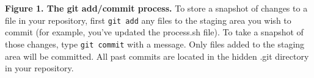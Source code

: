\textbf{Figure 1. The git add/commit process.} To store a snapshot of changes to a file in your repository, first \verb|git add| any files to the staging area you wish to commit (for example, you've updated the process.sh file). To take a snapshot of those changes, type \verb|git commit| with a message. Only files added to the staging area will be committed. All past commits are located in the hidden .git directory in your repository. 